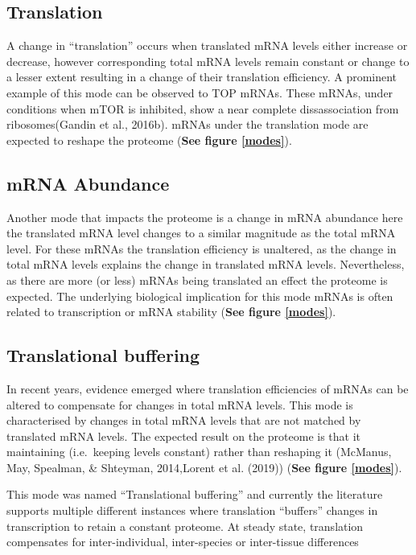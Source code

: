 \documentclass[12pt,openany]{book}
\begin{document}
\subsection{Translation}

A change in ``translation'' occurs when translated mRNA levels either
increase or decrease, however corresponding total mRNA levels remain
constant or change to a lesser extent resulting in a change of their
translation efficiency. A prominent example of this mode can be observed
to TOP mRNAs. These mRNAs, under conditions when mTOR is inhibited, show
a near complete dissassociation from ribosomes(Gandin et al., 2016b).
mRNAs under the translation mode are expected to reshape the proteome
(\textbf{See figure \ref{modes}}).

\subsection{mRNA Abundance}

Another mode that impacts the proteome is a change in mRNA abundance
here the translated mRNA level changes to a similar magnitude as the
total mRNA level. For these mRNAs the translation efficiency is
unaltered, as the change in total mRNA levels explains the change in
translated mRNA levels. Nevertheless, as there are more (or less) mRNAs
being translated an effect the proteome is expected. The underlying
biological implication for this mode mRNAs is often related to
transcription or mRNA stability (\textbf{See figure \ref{modes}}).

\subsection{Translational buffering} \label{modeBuffering}

In recent years, evidence emerged where translation efficiencies of
mRNAs can be altered to compensate for changes in total mRNA levels.
This mode is characterised by changes in total mRNA levels that are not
matched by translated mRNA levels. The expected result on the proteome
is that it maintaining (i.e.~keeping levels constant) rather than
reshaping it (McManus, May, Spealman, \& Shteyman, 2014,Lorent et al.
(2019)) (\textbf{See figure \ref{modes}}).

This mode was named ``Translational buffering'' and currently the
literature supports multiple different instances where translation
``buffers'' changes in transcription to retain a constant proteome. At
steady state, translation compensates for inter-individual,
inter-species or inter-tissue differences
\end{document}
